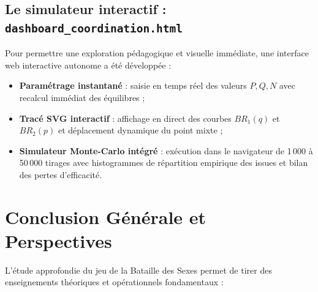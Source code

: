 \documentclass[11pt,a4paper]{article}
\begin{document}
\subsection{Le simulateur interactif : \texttt{dashboard\_coordination.html}}
Pour permettre une exploration pédagogique et visuelle immédiate, une interface web interactive autonome a été développée :
\begin{itemize}[leftmargin=1.5em]
    \item \textbf{Paramétrage instantané} : saisie en temps réel des valeurs $P, Q, N$ avec recalcul immédiat des équilibres ;
    \item \textbf{Tracé SVG interactif} : affichage en direct des courbes $BR_1(q)$ et $BR_2(p)$ et déplacement dynamique du point mixte ;
    \item \textbf{Simulateur Monte-Carlo intégré} : exécution dans le navigateur de 1\,000 à 50\,000 tirages avec histogrammes de répartition empirique des issues et bilan des pertes d'efficacité.
\end{itemize}

\newpage

\section{Conclusion Générale et Perspectives}\label{sec:conclusion}

L'étude approfondie du jeu de la Bataille des Sexes permet de tirer des enseignements théoriques et opérationnels fondamentaux :
\end{document}
